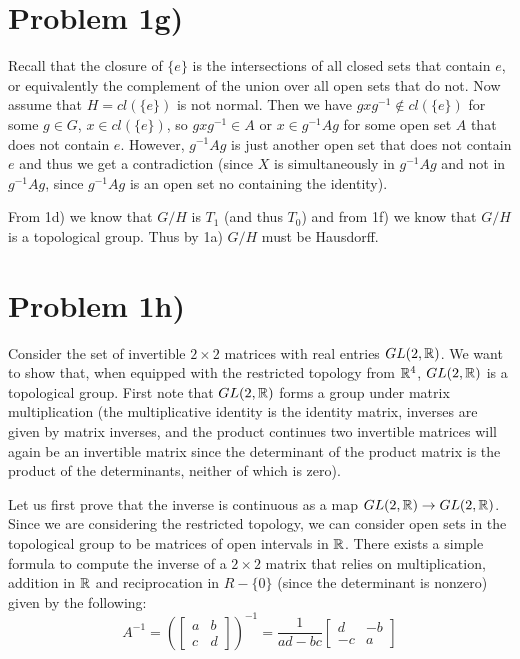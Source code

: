 \section*{Problem 1g)}
Recall that the closure of $\{e\}$ is the intersections of all closed sets that contain $e$, or equivalently the complement of the union over all open sets that do not. Now assume that $H=cl(\{e\})$ is not normal. Then we have $gxg^{-1}\notin cl(\{e\})$ for some $g\in G$, $x\in cl(\{e\})$, so $gxg^{-1} \in A$ or $x \in g^{-1}Ag$ for some open set $A$ that does not contain $e$.  However, $g^{-1}Ag$ is just another open set that does not contain $e$ and thus we get a contradiction (since $X$ is simultaneously in $g^{-1}Ag$ and not in $g^{-1}Ag$, since $g^{-1}Ag$ is an open set no containing the identity). \par
From 1d) we know that $G/H$ is $T_1$ (and thus $T_0$) and from 1f) we know that $G/H$ is a topological group. Thus by 1a) $G/H$ must be Hausdorff.
\section*{Problem 1h)}
Consider the set of invertible $2\times 2$ matrices with real entries $GL(2,\mathbb{R})$. We want to show that, when equipped with the restricted topology from $\mathbb{R}^4$, $GL(2,\mathbb{R})$ is a topological group. First note that $GL(2,\mathbb{R})$ forms a group under matrix multiplication (the multiplicative identity is the identity matrix, inverses are given by matrix inverses, and the product continues two invertible matrices will again be an invertible matrix since the determinant of the product matrix is the product of the determinants, neither of which is zero). \par 
Let us first prove that the inverse is continuous as a map $GL(2,\mathbb{R}) \to GL(2,\mathbb{R})$. Since we are considering the restricted topology, we can consider open sets in the topological group to be matrices of open intervals in $\mathbb{R}$. There exists a simple formula to compute the inverse of a $2\times 2$ matrix that relies on multiplication, addition in $\mathbb{R}$ and reciprocation in $R-\{0\}$ (since the determinant is nonzero) given by the following: 
\[ A^{-1} = \left(\begin{bmatrix}
 a & b \\ c & d
\end{bmatrix}\right)^{-1} = \frac{1}{ad-bc}\begin{bmatrix}
d & -b \\ -c & a
\end{bmatrix} \]

